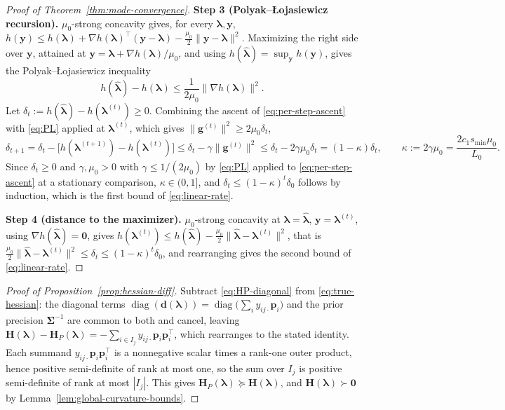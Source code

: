 \begin{proof}[Proof of Theorem~\ref{thm:mode-convergence}]
\noindent\textbf{Step 3 (Polyak--Łojasiewicz recursion).} $\mu_{0}$-strong concavity gives, for every $\bm{\lambda},\mathbf{y}$, $h(\mathbf{y})\leq h(\bm{\lambda})+\nabla h(\bm{\lambda})^{\top}(\mathbf{y}-\bm{\lambda})-\frac{\mu_{0}}{2}\|\mathbf{y}-\bm{\lambda}\|^{2}$. Maximizing the right side over $\mathbf{y}$, attained at $\mathbf{y}=\bm{\lambda}+\nabla h(\bm{\lambda})/\mu_{0}$, and using $h(\hat{\bm{\lambda}})=\sup_{\mathbf{y}}h(\mathbf{y})$, gives the Polyak--Łojasiewicz inequality
\begin{equation}
    h(\hat{\bm{\lambda}})-h(\bm{\lambda})\leq\frac{1}{2\mu_{0}}\|\nabla h(\bm{\lambda})\|^{2}.
    \label{eq:PL}
\end{equation}
Let $\delta_{t}:=h(\hat{\bm{\lambda}})-h(\bm{\lambda}^{(t)})\geq0$. Combining the ascent of \eqref{eq:per-step-ascent} with \eqref{eq:PL} applied at $\bm{\lambda}^{(t)}$, which gives $\|\mathbf{g}^{(t)}\|^{2}\geq2\mu_{0}\delta_{t}$,
\begin{equation}
    \delta_{t+1}=\delta_{t}-\big[h(\bm{\lambda}^{(t+1)})-h(\bm{\lambda}^{(t)})\big]\leq\delta_{t}-\gamma\|\mathbf{g}^{(t)}\|^{2}\leq\delta_{t}-2\gamma\mu_{0}\delta_{t}=(1-\kappa)\delta_{t},\qquad\kappa:=2\gamma\mu_{0}=\frac{2c_{1}s_{\min}\mu_{0}}{L_{0}}.
    \label{eq:pl-recursion}
\end{equation}
Since $\delta_{t}\geq0$ and $\gamma,\mu_{0}>0$ with $\gamma\leq1/(2\mu_{0})$ by \eqref{eq:PL} applied to \eqref{eq:per-step-ascent} at a stationary comparison, $\kappa\in(0,1]$, and $\delta_{t}\leq(1-\kappa)^{t}\delta_{0}$ follows by induction, which is the first bound of \eqref{eq:linear-rate}.

\noindent\textbf{Step 4 (distance to the maximizer).} $\mu_{0}$-strong concavity at $\bm{\lambda}=\hat{\bm{\lambda}}$, $\mathbf{y}=\bm{\lambda}^{(t)}$, using $\nabla h(\hat{\bm{\lambda}})=\bm{0}$, gives $h(\bm{\lambda}^{(t)})\leq h(\hat{\bm{\lambda}})-\frac{\mu_{0}}{2}\|\hat{\bm{\lambda}}-\bm{\lambda}^{(t)}\|^{2}$, that is $\frac{\mu_{0}}{2}\|\hat{\bm{\lambda}}-\bm{\lambda}^{(t)}\|^{2}\leq\delta_{t}\leq(1-\kappa)^{t}\delta_{0}$, and rearranging gives the second bound of \eqref{eq:linear-rate}.
\end{proof}

\begin{proof}[Proof of Proposition~\ref{prop:hessian-diff}]
Subtract \eqref{eq:HP-diagonal} from \eqref{eq:true-hessian}: the diagonal terms $\operatorname{diag}(\mathbf{d}(\bm{\lambda}))=\operatorname{diag}\big(\sum_{i}y_{ij\cdot}\bm{p}_{i}\big)$ and the prior precision $\bm{\Sigma}^{-1}$ are common to both and cancel, leaving $\mathbf{H}(\bm{\lambda})-\mathbf{H}_{P}(\bm{\lambda})=-\sum_{i\in I_{j}}y_{ij\cdot}\bm{p}_{i}\bm{p}_{i}^{\top}$, which rearranges to the stated identity. Each summand $y_{ij\cdot}\bm{p}_{i}\bm{p}_{i}^{\top}$ is a nonnegative scalar times a rank-one outer product, hence positive semi-definite of rank at most one, so the sum over $I_{j}$ is positive semi-definite of rank at most $|I_{j}|$. This gives $\mathbf{H}_{P}(\bm{\lambda})\succeq\mathbf{H}(\bm{\lambda})$, and $\mathbf{H}(\bm{\lambda})\succ\bm{0}$ by Lemma~\ref{lem:global-curvature-bounds}.
\end{proof}

